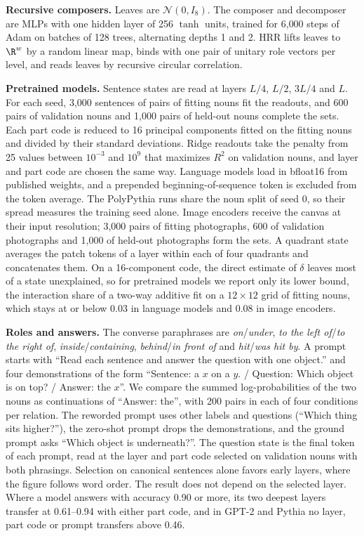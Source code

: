 \textbf{Recursive composers.} Leaves are $\mathcal{N}(0, I_8)$. The composer and decomposer are MLPs with one hidden layer of 256 $\tanh$ units, trained for 6{,}000 steps of Adam on batches of 128 trees, alternating depths 1 and 2. HRR lifts leaves to $\R^w$ by a random linear map, binds with one pair of unitary role vectors per level, and reads leaves by recursive circular correlation.

\textbf{Pretrained models.} Sentence states are read at layers $L/4$, $L/2$, $3L/4$ and $L$. For each seed, 3{,}000 sentences of pairs of fitting nouns fit the readouts, and 600 pairs of validation nouns and 1{,}000 pairs of held-out nouns complete the sets. Each part code is reduced to 16 principal components fitted on the fitting nouns and divided by their standard deviations. Ridge readouts take the penalty from 25 values between $10^{-3}$ and $10^{9}$ that maximizes $R^2$ on validation nouns, and layer and part code are chosen the same way. Language models load in bfloat16 from published weights, and a prepended beginning-of-sequence token is excluded from the token average. The PolyPythia runs share the noun split of seed 0, so their spread measures the training seed alone. Image encoders receive the canvas at their input resolution; 3{,}000 pairs of fitting photographs, 600 of validation photographs and 1{,}000 of held-out photographs form the sets. A quadrant state averages the patch tokens of a layer within each of four quadrants and concatenates them. On a 16-component code, the direct estimate of $\delta$ leaves most of a state unexplained, so for pretrained models we report only its lower bound, the interaction share of a two-way additive fit on a $12 \times 12$ grid of fitting nouns, which stays at or below 0.03 in language models and 0.08 in image encoders.

\textbf{Roles and answers.} The converse paraphrases are \emph{on}/\emph{under}, \emph{to the left of}/\emph{to the right of}, \emph{inside}/\emph{containing}, \emph{behind}/\emph{in front of} and \emph{hit}/\emph{was hit by}. A prompt starts with ``Read each sentence and answer the question with one object.'' and four demonstrations of the form ``Sentence: a $x$ on a $y$. / Question: Which object is on top? / Answer: the $x$''. We compare the summed log-probabilities of the two nouns as continuations of ``Answer: the'', with 200 pairs in each of four conditions per relation. The reworded prompt uses other labels and questions (``Which thing sits higher?''), the zero-shot prompt drops the demonstrations, and the ground prompt asks ``Which object is underneath?''. The question state is the final token of each prompt, read at the layer and part code selected on validation nouns with both phrasings. Selection on canonical sentences alone favors early layers, where the figure follows word order. The result does not depend on the selected layer. Where a model answers with accuracy 0.90 or more, its two deepest layers transfer at 0.61--0.94 with either part code, and in GPT-2 and Pythia no layer, part code or prompt transfers above 0.46.

